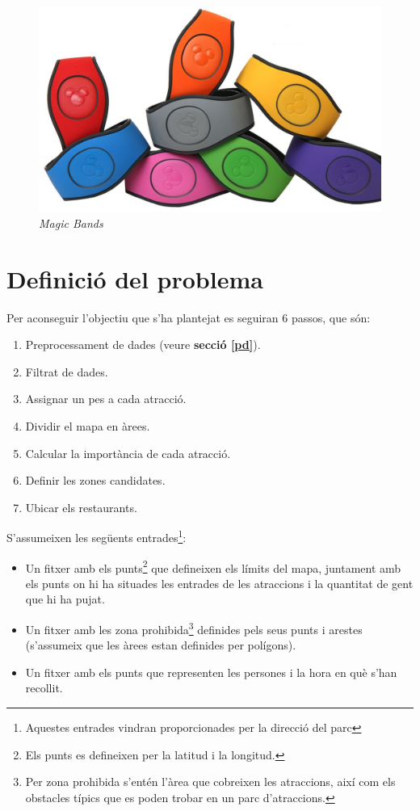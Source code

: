 \documentclass[12pt]{article}
\begin{document}
\begin{figure}[H]
    \centering
    \includegraphics[width=1\textwidth]{imatges/magic_bands.jpg}
    \caption{\textit{Magic Bands}}
    \label{fig:magic_bands}
\end{figure}

\clearpage
\section{Definició del problema}
Per aconseguir l'objectiu que s'ha plantejat es seguiran 6 passos, que són:
\begin{enumerate}
	\item Preprocessament de dades (veure \textbf{secció \ref{pd}}).
	\item Filtrat de dades.
	\item Assignar un pes a cada atracció.
	\item Dividir el mapa en àrees.
	\item Calcular la importància de cada atracció.
	\item Definir les zones candidates.
	\item Ubicar els restaurants.
\end{enumerate}

S'assumeixen les següents entrades\footnote{Aquestes entrades vindran proporcionades per la direcció del parc}:
\begin{itemize}
	\item Un fitxer amb els punts\footnote{Els punts es defineixen per la latitud i la longitud.} que defineixen els límits del mapa, juntament amb els punts on hi ha situades les entrades de les atraccions i la quantitat de gent que hi ha pujat.
	\item Un fitxer amb les zona prohibida\footnote{Per zona prohibida s'entén l'àrea que cobreixen les atraccions, així com els obstacles típics que es poden trobar en un parc d'atraccions.} definides pels seus punts i arestes (s'assumeix que les àrees estan definides per polígons).
	\item Un fitxer amb els punts que representen les persones i la hora en què s'han recollit.
\end{itemize}
\end{document}
